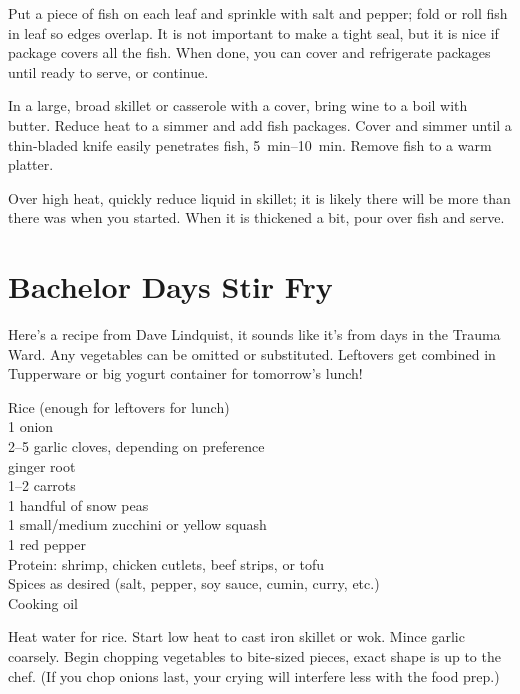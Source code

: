 Put a piece of fish on each leaf and sprinkle with salt and pepper; fold or roll
fish in leaf so edges overlap. It is not important to make a tight seal, but it
is nice if package covers all the fish. When done, you can cover and refrigerate
packages until ready to serve, or continue.

In a large, broad skillet or casserole with a cover, bring wine to a boil with
butter. Reduce heat to a simmer and add fish packages. Cover and simmer until a
thin-bladed knife easily penetrates fish, \SIrange{5}{10}{\minute}. Remove fish
to a warm platter.

Over high heat, quickly reduce liquid in skillet; it is likely there will be
more than there was when you started. When it is thickened a bit, pour over fish
and serve.

\section{Bachelor Days Stir Fry}

\begin{open}
    Here's a recipe from Dave Lindquist, it sounds like it's from days in the
    Trauma Ward. Any vegetables can be omitted or substituted. Leftovers get
    combined in Tupperware or big yogurt container for tomorrow's lunch!
\end{open}
\begin{ingredients}
    Rice (enough for leftovers for lunch)\\
    1 onion\\
    \numrange{2}{5} garlic cloves, depending on preference\\
    ginger root\\
    \numrange{1}{2} carrots\\
    1 handful of snow peas\\
    1 small/medium zucchini or yellow squash\\
    1 red pepper\\
    Protein: shrimp, chicken cutlets, beef strips, or tofu\\
    Spices as desired (salt, pepper, soy sauce, cumin, curry, etc.)\\
    Cooking oil\\
\end{ingredients}
Heat water for rice. Start low heat to cast iron skillet or wok. Mince garlic
coarsely. Begin chopping vegetables to bite-sized pieces, exact shape is up to
the chef. (If you chop onions last, your crying will interfere less with the
food prep.)

